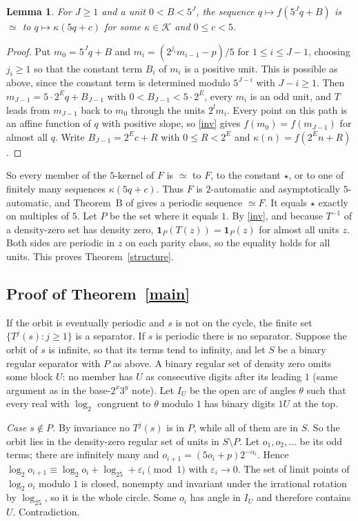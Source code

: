 \documentclass[11pt]{article}
\newtheorem{lemma}[theorem]{Lemma}
\theoremstyle{remark}
\begin{document}
\begin{lemma}\label{bridge}
For $J\ge1$ and a unit $0<B<5^J$, the sequence $q\mapsto f(5^Jq+B)$ is $\simeq$
to $q\mapsto\kappa(5q+c)$ for some $\kappa\in\mathcal K$ and $0\le c<5$.
\end{lemma}
\begin{proof}
Put $m_0=5^Jq+B$ and $m_i=(2^{j_i}m_{i-1}-p)/5$ for $1\le i\le J-1$, choosing
$j_i\ge1$ so that the constant term $B_i$ of $m_i$ is a positive unit. This is
possible as above, since the constant term is determined modulo $5^{J-i}$ with
$J-i\ge1$. Then $m_{J-1}=5\cdot2^{E}q+B_{J-1}$ with $0<B_{J-1}<5\cdot2^{E}$,
every $m_i$ is an odd unit, and $T$ leads from $m_{J-1}$ back to $m_0$ through
the units $2^{l}m_{i}$. Every point on this path is an affine function of $q$
with positive slope, so \eqref{inv} gives $f(m_0)=f(m_{J-1})$ for almost all
$q$. Write $B_{J-1}=2^{E}c+R$ with $0\le R<2^{E}$ and
$\kappa(n)=f(2^{E}n+R)$.
\end{proof}

So every member of the $5$-kernel of $F$ is $\simeq$ to $F$, to the constant
$\star$, or to one of finitely many sequences $\kappa(5q+c)$. Thus $F$ is
$2$-automatic and asymptotically $5$-automatic, and Theorem~B of \cite{K} gives
a periodic sequence $\simeq F$. It equals $\star$ exactly on multiples of $5$.
Let $P$ be the set where it equals $1$. By \eqref{inv}, and because $T^{-1}$ of
a density-zero set has density zero, $\mathbf 1_P(T(z))=\mathbf 1_P(z)$ for
almost all units $z$. Both sides are periodic in $z$ on each parity class, so
the equality holds for all units. This proves Theorem~\ref{structure}.

\subsection{Proof of Theorem~\ref{main}}

If the orbit is eventually periodic and $s$ is not on the cycle, the finite set
$\{T^j(s):j\ge1\}$ is a separator. If $s$ is periodic there is no separator.
Suppose the orbit of $s$ is infinite, so that its terms tend to infinity, and
let $S$ be a binary regular separator with $P$ as above. A binary regular set
of density zero omits some block $U$: no member has $U$ as consecutive digits
after its leading $1$ (same argument as in the base-$2^x3^y$ note). Let $I_U$ be
the open arc of angles $\theta$ such that every real with
$\log_2$ congruent to $\theta$ modulo $1$ has binary digits $1U$ at the top.

\emph{Case $s\notin P$.} By invariance no $T^j(s)$ is in $P$, while all of them
are in $S$. So the orbit lies in the density-zero regular set of units in
$S\setminus P$. Let $o_1,o_2,\dots$ be its odd terms; there are infinitely many
and $o_{i+1}=(5o_i+p)2^{-\alpha_i}$. Hence
$\log_2o_{i+1}\equiv\log_2o_i+\log_25+\varepsilon_i\pmod1$ with
$\varepsilon_i\to0$. The set of limit points of $\log_2o_i$ modulo $1$ is
closed, nonempty and invariant under the irrational rotation by $\log_25$, so
it is the whole circle. Some $o_i$ has angle in $I_U$ and therefore contains
$U$. Contradiction.
\end{document}
